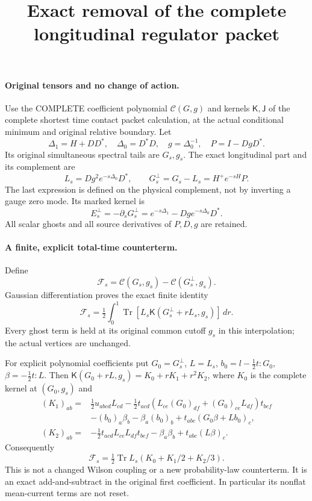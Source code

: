 \documentclass[11pt]{article}
\title{Exact removal of the complete longitudinal regulator packet}\author{}\date{}
\begin{document}
\maketitle
\paragraph{Original tensors and no change of action.}
Use the COMPLETE coefficient polynomial $\mathcal C(G,g)$ and kernels
$\mathsf K,\mathsf J$ of the complete shortest time contact packet calculation, at the actual conditional minimum
and original relative boundary. Let
\[
 \Delta_1=H+DD^*,\quad \Delta_0=D^*D,\quad g=\Delta_0^{-1},\quad
 P=I-DgD^*.
\]
Its original simultaneous spectral tails are $G_s,g_s$.
The exact longitudinal part and its complement are
\[
 L_s=Dg^2e^{-s\Delta_0}D^*,\qquad
 G_s^\perp=G_s-L_s=H^+e^{-sH}P.                                 \tag{1}
\]
The last expression is defined on the physical complement, not by
inverting a gauge zero mode. Its marked kernel is
\[
 E_s^\perp=-\partial_sG_s^\perp
       =e^{-s\Delta_1}-Dg e^{-s\Delta_0}D^*.                     \tag{2}
\]
All scalar ghosts and all source derivatives of $P,D,g$ are retained.

\paragraph{A finite, explicit total-time counterterm.}
Define
\[
 \mathcal F_s=\mathcal C(G_s,g_s)-\mathcal C(G_s^\perp,g_s).
\]
Gaussian differentiation proves the exact finite identity
\[
 \boxed{\mathcal F_s=
 \tfrac12\int_0^1\operatorname{Tr}
 \left[L_s\mathsf K(G_s^\perp+rL_s,g_s)\right]\,dr.}              \tag{3}
\]
Every ghost term is held at its original common cutoff $g_s$ in
this interpolation; the actual vertices are unchanged.

For explicit polynomial coefficients put $G_0=G_s^\perp$, $L=L_s$,
$b_0=l-\tfrac12t:G_0$, $\beta=-\tfrac12t:L$. Then
$\mathsf K(G_0+rL,g_s)=K_0+rK_1+r^2K_2$, where $K_0$ is the
complete kernel at $(G_0,g_s)$ and
\[
 \begin{split}
 (K_1)_{ab}={}&\tfrac12u_{abcd}L_{cd}
 -\tfrac12t_{acd}(L_{ce}(G_0)_{df}+(G_0)_{ce}L_{df})t_{bef}\\
 &-(b_0)_a\beta_b-\beta_a(b_0)_b
       +t_{abc}(G_0\beta+Lb_0)_c,\\
 (K_2)_{ab}={}&-\tfrac12t_{acd}L_{ce}L_{df}t_{bef}
                       -\beta_a\beta_b+t_{abc}(L\beta)_c .
 \end{split}
\]
Consequently
\[
 \mathcal F_s=\tfrac12\operatorname{Tr}
           L_s(K_0+K_1/2+K_2/3).                               \tag{4}
\]
This is not a changed Wilson coupling or a new probability-law
counterterm. It is an exact add-and-subtract in the original first
coefficient. In particular its nonflat mean-current terms are not reset.
\end{document}
